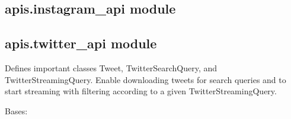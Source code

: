 \documentclass[letterpaper,10pt,english]{sphinxmanual}
\begin{document}

\begin{fulllineitems}
\label{apis:apis.flickr_api.get_points}
\end{fulllineitems}


\begin{fulllineitems}
\label{apis:apis.flickr_api.print_places}
\end{fulllineitems}


\begin{fulllineitems}
\label{apis:apis.flickr_api.retrieve_place_name}
\end{fulllineitems}



\subsection{apis.instagram\_api module}
\label{apis:apis-instagram-api-module}\label{apis:module-apis.instagram_api}

\subsection{apis.twitter\_api module}
\label{apis:module-apis.twitter_api}\label{apis:apis-twitter-api-module}
Defines important classes Tweet, TwitterSearchQuery, and TwitterStreamingQuery. Enable downloading tweets for search queries and to start streaming with filtering according to a given TwitterStreamingQuery.

\begin{fulllineitems}
\label{apis:apis.twitter_api.PrintingListener}
Bases: {\hyperref[apis:apis.twitter_api.TwitterStreamListener]{\emph{}}}

\begin{fulllineitems}
\label{apis:apis.twitter_api.PrintingListener.on_status}
\end{fulllineitems}


\end{fulllineitems}
\end{document}
